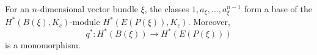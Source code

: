 For an $n$-dimensional vector bundle $\xi$, the classes $1, a_{\xi}, \ldots, a_{\xi}^{n-1}$ form a base of the $H^*(B(\xi), K_c)$-module $H^*(E(P(\xi)), K_c)$. Moreover,
$$q^*: H^*(B(\xi)) \to H^*(E(P(\xi)))$$
is a monomorphism.
